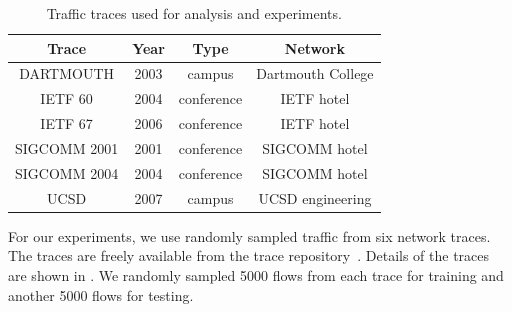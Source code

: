\documentclass{acm_proc_article-sp}
\begin{document}
\begin{table}
\begin{center}
\scriptsize
\begin{tabular}{|c|c|c|c|}

\hline
\textbf{Trace} &
\textbf{Year} &
\textbf{Type} &
\textbf{Network} \\
\hline

{\scriptsize{DARTMOUTH}} &
2003 &
campus &
Dartmouth College \\
\hline

{\scriptsize{IETF 60}} &
2004 &
conference &
IETF hotel \\
\hline

{\scriptsize{IETF 67}} &
2006 &
conference &
IETF hotel \\
\hline

{\scriptsize{SIGCOMM 2001}} &
2001 &
conference &
SIGCOMM hotel \\
\hline

{\scriptsize{SIGCOMM 2004}} &
2004 &
conference &
SIGCOMM hotel \\
\hline

{\scriptsize{UCSD}} &
2007 &
campus &
UCSD engineering \\
\hline

\end{tabular}
\caption{Traffic traces used for analysis and experiments.}
\end{center}
\vspace{-2.5em}
\end{table}

For our experiments, we use randomly sampled traffic from six network traces.
The traces are freely available from the  trace repository~\cite{Yeo06}.
Details of the traces are shown in .
We randomly sampled 5000 flows from each trace for training and another 5000 flows for testing.

\vfill
\break
\end{document}
